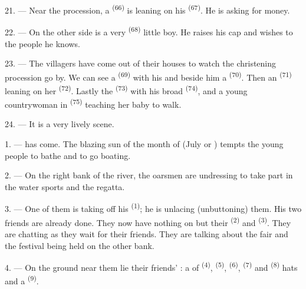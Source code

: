 \VUsaut{4.6mm}
\VUsaut{3.4mm}

21. --- Near the procession, a  \textsuperscript{(66)} is leaning on his
 \textsuperscript{(67)}. He is asking for money.

22. --- On the other side is a very  \textsuperscript{(68)} little boy. He
raises his cap and wishes  to the people he knows.

23. --- The villagers have come out of their houses to watch the christening procession go by.
We can see a  \textsuperscript{(69)} with his  and
beside him a
 \textsuperscript{(70)}. Then an 
\textsuperscript{(71)} leaning on her  \textsuperscript{(72)}. Lastly the
 \textsuperscript{(73)} with his broad  \textsuperscript{(74)},
and a young countrywoman in  \textsuperscript{(75)} teaching her baby to walk.

24. --- It is a very lively scene.
\VUsaut{4.0mm}

\VUsaut{3.0mm}

\VUsaut{2.4mm}

\VUsaut{3.0mm}

1. ---  has come. The blazing sun of the month of
 (July or ) tempts the young people to bathe
and to go boating.

2. --- On the right bank of the river, the oarsmen are undressing to take part in the water
sports and the regatta.

3. --- One of them is taking off his  \textsuperscript{(1)}; he is unlacing
(unbuttoning) them. His two friends are already done. They now have nothing on but their
 \textsuperscript{(2)} and
 \textsuperscript{(3)}. They are chatting as they wait for
their friends. They are talking about the fair and the festival being held on the other bank.

4. --- On the ground near them lie their friends' : a
 of  \textsuperscript{(4)},  \textsuperscript{(5)},
 \textsuperscript{(6)},  \textsuperscript{(7)} and 
\textsuperscript{(8)} hats and a  \textsuperscript{(9)}.

